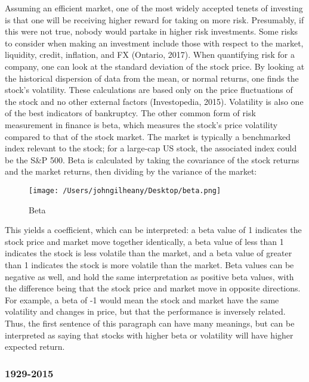 \documentclass[12pt,twoside]{reedthesis}
\theoremstyle{definition}
\theoremstyle{definition}
\theoremstyle{definition}
\theoremstyle{remark}
\begin{document}
Assuming an efficient market, one of the most widely accepted tenets of
investing is that one will be receiving higher reward for taking on more
risk. Presumably, if this were not true, nobody would partake in higher
risk investments. Some risks to consider when making an investment
include those with respect to the market, liquidity, credit, inflation,
and FX (Ontario, 2017). When quantifying risk for a company, one can
look at the standard deviation of the stock price. By looking at the
historical dispersion of data from the mean, or normal returns, one
finds the stock's volatility. These calculations are based only on the
price fluctuations of the stock and no other external factors
(Investopedia, 2015). Volatility is also one of the best indicators of
bankruptcy. The other common form of risk measurement in finance is
beta, which measures the stock's price volatility compared to that of
the stock market. The market is typically a benchmarked index relevant
to the stock; for a large-cap US stock, the associated index could be
the S\&P 500. Beta is calculated by taking the covariance of the stock
returns and the market returns, then dividing by the variance of the
market:
\begin{figure}
\centerline{\texttt{[image: /Users/johngilheany/Desktop/beta.png]}}
\caption{Beta}
\label{B}
\end{figure}
This yields a coefficient, which can be interpreted: a beta value of 1
indicates the stock price and market move together identically, a beta
value of less than 1 indicates the stock is less volatile than the
market, and a beta value of greater than 1 indicates the stock is more
volatile than the market. Beta values can be negative as well, and hold
the same interpretation as positive beta values, with the difference
being that the stock price and market move in opposite directions. For
example, a beta of -1 would mean the stock and market have the same
volatility and changes in price, but that the performance is inversely
related. Thus, the first sentence of this paragraph can have many
meanings, but can be interpreted as saying that stocks with higher beta
or volatility will have higher expected return.

\subsubsection{1929-2015}\label{section}
\end{document}
